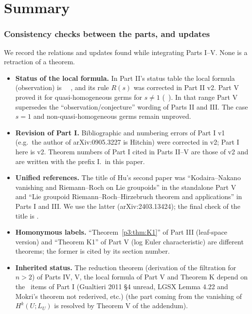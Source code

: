 \part*{Summary}
\renewcommand{\thesection}{S.\arabic{section}}\setcounter{section}{0}
\section{Consistency checks between the parts, and updates}
We record the relations and updates found while integrating Parts I--V. None is a retraction of a theorem.
\begin{itemize}
\item \textbf{Status of the local formula.} In Part II's status table the local formula (observation) is \tP\ \tV\ \tK, and its rule $R(s)$ was corrected in Part II v2. Part V proved it for quasi-homogeneous germs for $s\ne1$ (\tP\ \tQ). In that range Part V supersedes the ``observation/conjecture'' wording of Parts II and III. The case $s=1$ and non-quasi-homogeneous germs remain unproved.
\item \textbf{Revision of Part I.} Bibliographic and numbering errors of Part I v1 (e.g.\ the author of arXiv:0905.3227 is Hitchin) were corrected in v2; Part I here is v2. Theorem numbers of Part I cited in Parts II--V are those of v2 and are written with the prefix I.\ in this paper.
\item \textbf{Unified references.} The title of Hu's second paper was ``Kodaira--Nakano vanishing and Riemann--Roch on Lie groupoids'' in the standalone Part V and ``Lie groupoid Riemann--Roch--Hirzebruch theorem and applications'' in Parts I and III. We use the latter (arXiv:2403.13424); the final check of the title is \tQ.
\item \textbf{Homonymous labels.} ``Theorem~\ref{p3:thm:K1}'' of Part III (leaf-space version) and ``Theorem K1'' of Part V (log Euler characteristic) are different theorems; the former is cited by its section number.
\item \textbf{Inherited status.} The reduction theorem (derivation of the filtration for $n>2$) of Parts IV, V, the local formula of Part V and Theorem K depend on the \tQ\ items of Part I (Gualtieri 2011 \S4 unread, LGSX Lemma 4.22 and Mokri's theorem not rederived, etc.) (the part coming from the vanishing of $H^k(U;L_U)$ is resolved by Theorem V of the addendum).
\end{itemize}

